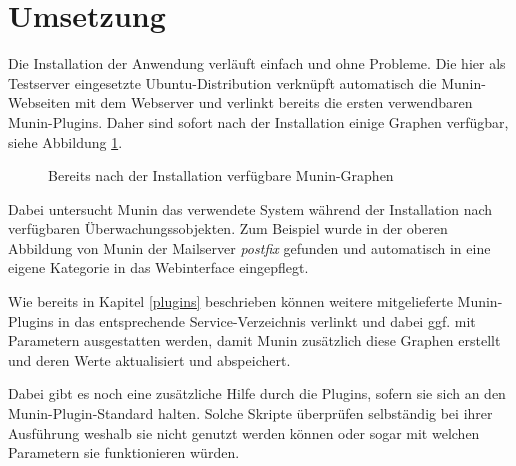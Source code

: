 \section{Umsetzung}
\label{umsetzung}
Die Installation der Anwendung verläuft einfach und ohne Probleme.
Die hier als Testserver eingesetzte Ubuntu-Distribution verknüpft automatisch die Munin-Webseiten mit dem Webserver und verlinkt bereits die ersten verwendbaren Munin-Plugins.
Daher sind sofort nach der Installation einige Graphen verfügbar, siehe Abbildung \ref{ootb}.

\begin{figure}[ht]
	\centering
		\caption{Bereits nach der Installation verfügbare Munin-Graphen}
		\label{ootb}
\end{figure}

Dabei untersucht Munin das verwendete System während der Installation nach verfügbaren Überwachungssobjekten.
Zum Beispiel wurde in der oberen Abbildung von Munin der Mailserver \textit{postfix} gefunden und automatisch in eine eigene Kategorie in das Webinterface eingepflegt.

Wie bereits in Kapitel \ref{plugins} beschrieben können weitere mitgelieferte Munin-Plugins in das entsprechende Service-Verzeichnis verlinkt und dabei ggf. mit Parametern ausgestatten werden, damit Munin zusätzlich diese Graphen erstellt und deren Werte aktualisiert und abspeichert.

Dabei gibt es noch eine zusätzliche Hilfe durch die Plugins, sofern sie sich an den Munin-Plugin-Standard halten.
Solche Skripte überprüfen selbständig bei ihrer Ausführung weshalb sie nicht genutzt werden können oder sogar mit welchen Parametern sie funktionieren würden.

